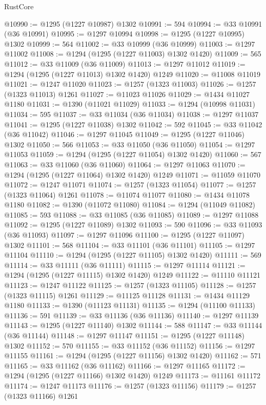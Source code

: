\begin{lexlean}{RustCore}
\begin{coremodule}
@10990 := @1295 (@1227 @10987) @1302
@10991 := 594
@10994 := @33 @10991 (@36 @10991)
@10995 := @1297 @10994
@10998 := @1295 (@1227 @10995) @1302
@10999 := 564
@11002 := @33 @10999 (@36 @10999)
@11003 := @1297 @11002
@11008 := @1294 (@1295 (@1227 @11003) @1302 @1420)
@11009 := 565
@11012 := @33 @11009 (@36 @11009)
@11013 := @1297 @11012
@11019 := @1294 (@1295 (@1227 @11013) @1302 @1420) @1249
@11020 := @11008 @11019
@11021 := @1247 @11020
@11023 := @1257 (@1323 @11003)
@11026 := @1257 (@1323 @11013) @1261
@11027 := @11023 @11026
@11029 := @1434 @11027 @1180
@11031 := @1390 (@11021 @11029)
@11033 := @1294 (@10998 @11031)
@11034 := 595
@11037 := @33 @11034 (@36 @11034)
@11038 := @1297 @11037
@11041 := @1295 (@1227 @11038) @1302
@11042 := 592
@11045 := @33 @11042 (@36 @11042)
@11046 := @1297 @11045
@11049 := @1295 (@1227 @11046) @1302
@11050 := 566
@11053 := @33 @11050 (@36 @11050)
@11054 := @1297 @11053
@11059 := @1294 (@1295 (@1227 @11054) @1302 @1420)
@11060 := 567
@11063 := @33 @11060 (@36 @11060)
@11064 := @1297 @11063
@11070 := @1294 (@1295 (@1227 @11064) @1302 @1420) @1249
@11071 := @11059 @11070
@11072 := @1247 @11071
@11074 := @1257 (@1323 @11054)
@11077 := @1257 (@1323 @11064) @1261
@11078 := @11074 @11077
@11080 := @1434 @11078 @1180
@11082 := @1390 (@11072 @11080)
@11084 := @1294 (@11049 @11082)
@11085 := 593
@11088 := @33 @11085 (@36 @11085)
@11089 := @1297 @11088
@11092 := @1295 (@1227 @11089) @1302
@11093 := 590
@11096 := @33 @11093 (@36 @11093)
@11097 := @1297 @11096
@11100 := @1295 (@1227 @11097) @1302
@11101 := 568
@11104 := @33 @11101 (@36 @11101)
@11105 := @1297 @11104
@11110 := @1294 (@1295 (@1227 @11105) @1302 @1420)
@11111 := 569
@11114 := @33 @11111 (@36 @11111)
@11115 := @1297 @11114
@11121 := @1294 (@1295 (@1227 @11115) @1302 @1420) @1249
@11122 := @11110 @11121
@11123 := @1247 @11122
@11125 := @1257 (@1323 @11105)
@11128 := @1257 (@1323 @11115) @1261
@11129 := @11125 @11128
@11131 := @1434 @11129 @1180
@11133 := @1390 (@11123 @11131)
@11135 := @1294 (@11100 @11133)
@11136 := 591
@11139 := @33 @11136 (@36 @11136)
@11140 := @1297 @11139
@11143 := @1295 (@1227 @11140) @1302
@11144 := 588
@11147 := @33 @11144 (@36 @11144)
@11148 := @1297 @11147
@11151 := @1295 (@1227 @11148) @1302
@11152 := 570
@11155 := @33 @11152 (@36 @11152)
@11156 := @1297 @11155
@11161 := @1294 (@1295 (@1227 @11156) @1302 @1420)
@11162 := 571
@11165 := @33 @11162 (@36 @11162)
@11166 := @1297 @11165
@11172 := @1294 (@1295 (@1227 @11166) @1302 @1420) @1249
@11173 := @11161 @11172
@11174 := @1247 @11173
@11176 := @1257 (@1323 @11156)
@11179 := @1257 (@1323 @11166) @1261

\end{coremodule}
\end{lexlean}
